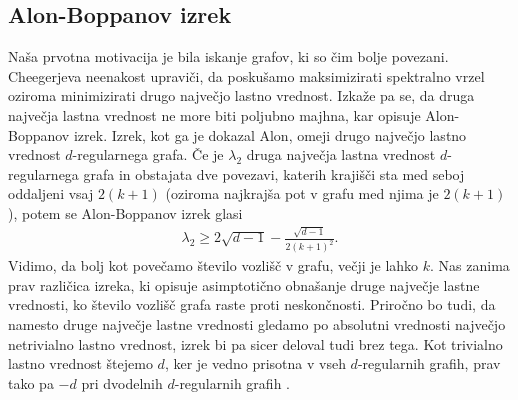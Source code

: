 \subsection{Alon-Boppanov izrek}
Naša prvotna motivacija je bila iskanje grafov, ki so čim bolje povezani. Cheegerjeva neenakost upraviči, da poskušamo maksimizirati spektralno vrzel oziroma minimizirati drugo največjo lastno vrednost. Izkaže pa se, da druga največja lastna vrednost ne more biti poljubno majhna, kar opisuje Alon-Boppanov izrek. Izrek, kot ga je dokazal Alon, omeji drugo največjo lastno vrednost \(d\)-regularnega grafa. Če je \(\lambda_2\) druga največja lastna vrednost \(d\)-regularnega grafa in obstajata dve povezavi, katerih krajišči sta med seboj oddaljeni vsaj \(2(k+1)\) (oziroma najkrajša pot v grafu med njima je \(2(k+1)\)), potem se Alon-Boppanov \cite{alon-boppana-original} izrek glasi 
\begin{align*}
    \lambda_2 \geq 2\sqrt{d-1} - \frac{\sqrt{d-1}}{2(k+1)^2}.
\end{align*}
Vidimo, da bolj kot povečamo število vozlišč v grafu, večji je lahko \(k\). Nas zanima prav različica izreka, ki opisuje asimptotično obnašanje druge največje lastne vrednosti, ko število vozlišč grafa raste proti neskončnosti. Priročno bo tudi, da namesto druge največje lastne vrednosti gledamo po absolutni vrednosti največjo netrivialno lastno vrednost, izrek bi pa sicer deloval tudi brez tega. Kot trivialno lastno vrednost štejemo \(d\), ker je vedno prisotna v vseh \(d\)-regularnih grafih, prav tako pa \(-d\) pri dvodelnih \(d\)-regularnih grafih \cite{lps-ramanujan}.

